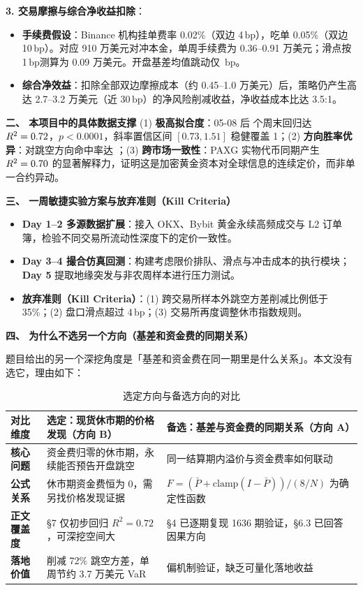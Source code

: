\documentclass[UTF8,zihao=5,a4paper]{ctexart}
\newcommand{\key}[1]{\textbf{#1}}
\newcommand{\bp}{\ensuremath{\,\mathrm{bp}}}
\begin{document}
{\noindent\textbf{3. 交易摩擦与综合净收益扣除}：
\begin{itemize}[leftmargin=1.2em,itemsep=2pt]
\item \key{手续费假设}：Binance 机构挂单费率 0.02\%（双边 4\bp），吃单 0.05\%（双边 10\bp）。对应 910 万美元对冲本金，单周手续费为 0.36--0.91 万美元；滑点按 1\bp 测算为 0.09 万美元。开盘基差均值跳动仅 \clReopenPost\bp。
\item \key{综合净效益}：扣除全部双边摩擦成本（约 0.45--1.0 万美元）后，策略仍产生高达 2.7--3.2 万美元（近 30\bp）的净风险削减收益，净收益成本比达 3.5:1。
\end{itemize}

\key{二、 本项目中的具体数据支撑}
(1) \textbf{极高拟合度}：05-08 后 \clWkPostn 个周末回归达 $R^2 = 0.72$，$p < 0.0001$，斜率置信区间 $[0.73, 1.51]$ 稳健覆盖 1；(2) \textbf{方向胜率优异}：对跳空方向命中率达 \clWkPosthit；(3) \textbf{跨市场一致性}：PAXG 实物代币同期产生 $R^2 = 0.70$ 的显著解释力，证明这是加密黄金资本对全球信息的连续定价，而非单一合约异动。

\key{三、 一周敏捷实验方案与放弃准则（Kill Criteria）}
\begin{itemize}[leftmargin=1.2em,itemsep=2pt]
\item \key{Day 1--2 多源数据扩展}：接入 OKX、Bybit 黄金永续高频成交与 L2 订单簿，检验不同交易所流动性深度下的定价一致性。
\item \key{Day 3--4 撮合仿真回测}：构建考虑限价排队、滑点与冲击成本的执行模块；\key{Day 5} 提取地缘突发与非农周样本进行压力测试。
\item \key{放弃准则（Kill Criteria）}：(1) 跨交易所样本外跳空方差削减比例低于 35\%；(2) 盘口滑点超过 4\bp；(3) 交易所再度调整休市指数规则。
\end{itemize}

\key{四、 为什么不选另一个方向（基差和资金费的同期关系）}

题目给出的另一个深挖角度是「基差和资金费在同一期里是什么关系」。本文没有选它，理由如下：

\begin{table}[htb]\centering\footnotesize
\setlength{\tabcolsep}{3.5pt}\renewcommand{\arraystretch}{1.25}
\caption{选定方向与备选方向的对比}\label{tab:comp}
\begin{tabularx}{\linewidth}{lXX}
\toprule
\textbf{对比维度} & \textbf{选定：现货休市期的价格发现（方向 B）} & \textbf{备选：基差与资金费的同期关系（方向 A）} \\
\midrule
\textbf{核心问题} & 资金费归零的休市期，永续能否预告开盘跳空 & 同一结算期内溢价与资金费率如何联动 \\
\textbf{公式关系} & 休市期资金费恒为 0，需另找价格发现证据 & $F=(\bar{P}+\mathrm{clamp}(I-\bar{P}))/ (8/N)$ 为确定性函数 \\
\textbf{正文覆盖度} & §7 仅初步回归 $R^2=0.72$，可深挖空间大 & §4 已逐期复现 1636 期验证，§6.3 已回答因果方向 \\
\textbf{落地价值} & 削减 72\% 跳空方差，单周节约 3.7 万美元 VaR & 偏机制验证，缺乏可量化落地收益 \\
\bottomrule
\end{tabularx}
\end{table}

}
\end{document}
